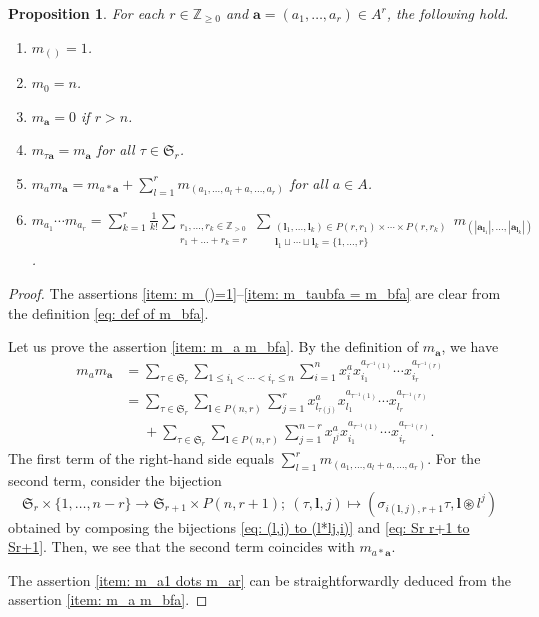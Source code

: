 \documentclass[12pt,a4paper]{amsart}
\newtheorem{prop}[thm]{Proposition}
\theoremstyle{definition}
\numberwithin{equation}{subsection}
\begin{document}
\begin{prop}\label{prop: basic properties of m_bfa}
  For each $r \in \mathbb{Z}_{\geq 0}$ and $\mathbf{a} = (a_1,\dots,a_r) \in A^r$, the following hold.
  \begin{enumerate}
    \item \label{item: m_()=1}$m_{()} = 1$.
    \item $m_0 = n$.
    \item $m_\mathbf{a} = 0$ if $r > n$.
    \item \label{item: m_taubfa = m_bfa}$m_{\tau \mathbf{a}} = m_\mathbf{a}$ for all $\tau \in \mathfrak{S}_r$.
    \item \label{item: m_a m_bfa}$m_a m_\mathbf{a} = m_{a*\mathbf{a}} + \sum_{l=1}^r m_{(a_1,\dots,a_l+a,\dots,a_r)}$ for all $a \in A$.
    \item \label{item: m_a1 dots m_ar}$m_{a_1} \cdots m_{a_r} = \sum_{k=1}^r \frac{1}{k!} \sum_{\substack{r_1,\dots,r_k \in \mathbb{Z}_{> 0}\\r_1+\dots+r_k = r}} \sum_{\substack{(\mathbf{l}_1,\dots,\mathbf{l}_k) \in P(r,r_1) \times \cdots \times P(r,r_k)\\ \mathbf{l}_1 \sqcup \cdots \sqcup \mathbf{l}_k = \{ 1,\dots,r \}}} m_{(|\mathbf{a}_{\mathbf{l}_1}|,\dots,|\mathbf{a}_{\mathbf{l}_k}|)}$.
  \end{enumerate}
\end{prop}
\begin{proof}
  The assertions \eqref{item: m_()=1}--\eqref{item: m_taubfa = m_bfa} are clear from the definition \eqref{eq: def of m_bfa}.

  Let us prove the assertion \eqref{item: m_a m_bfa}.
  By the definition of $m_\mathbf{a}$, we have
  \begin{align*}
    m_a m_\mathbf{a}
    &=
    \sum_{\tau \in \mathfrak{S}_r} \sum_{1 \leq i_1 < \cdots < i_r \leq n} \sum_{i=1}^n x_i^a x_{i_1}^{a_{\tau^{-1}(1)}} \cdots x_{i_r}^{a_{\tau^{-1}(r)}}\\
    &=
    \sum_{\tau \in \mathfrak{S}_r} \sum_{\mathbf{l} \in P(n,r)} \sum_{j=1}^{r} x_{l_{\tau(j)}}^a x_{l_1}^{a_{\tau^{-1}(1)}} \cdots x_{l_r}^{a_{\tau^{-1}(r)}}\\
    &\phantom{=}+
    \sum_{\tau \in \mathfrak{S}_r} \sum_{\mathbf{l} \in P(n,r)} \sum_{j=1}^{n-r} x_{l^j}^a x_{i_1}^{a_{\tau^{-1}(1)}} \cdots x_{i_r}^{a_{\tau^{-1}(r)}}.
  \end{align*}
  The first term of the right-hand side equals $\sum_{l=1}^r m_{(a_1,\dots,a_l+a,\dots,a_r)}$.
  For the second term, consider the bijection
  \[
    \mathfrak{S}_r \times \{1,\dots,n-r\} \to \mathfrak{S}_{r+1} \times P(n,r+1);\ (\tau,\mathbf{l},j) \mapsto (\sigma_{i(\mathbf{l},j),r+1}\tau, \mathbf{l} \circledast l^j)
  \]
  obtained by composing the bijections \eqref{eq: (l,j) to (l*lj,i)} and \eqref{eq: Sr r+1 to Sr+1}.
  Then, we see that the second term coincides with $m_{a*\mathbf{a}}$.

  The assertion \eqref{item: m_a1 dots m_ar} can be straightforwardly deduced from the assertion \eqref{item: m_a m_bfa}.
\end{proof}
\end{document}
